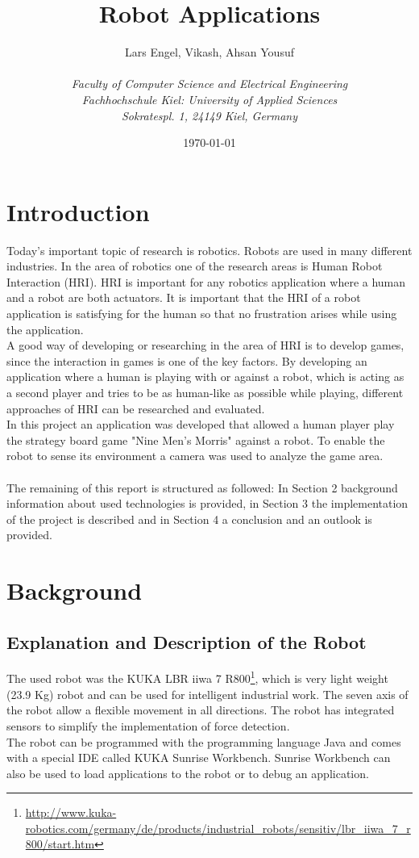 \documentclass[a4paper]{spie}  %
\title{Robot Applications}
\author{Lars Engel, Vikash, Ahsan Yousuf
\\\textit{\\Faculty of Computer Science and Electrical Engineering
\\Fachhochschule Kiel: University of Applied Sciences\\ Sokratespl. 1, 24149 Kiel, Germany}
}
\date{\today}
\begin{document}
 
  
  \begin{LARGE}
  \maketitle
  \end{LARGE}
  \vspace{60pt}
  \begin{large}
  \tableofcontents
  \newpage



\section{Introduction}
Today's important topic of research is robotics. Robots are used in many different industries. In the area of robotics one of the research areas is Human Robot Interaction (HRI). HRI is important for any robotics application where a human and a robot are both actuators. It is important that the HRI of a robot application is satisfying for the human so that no frustration arises while using the application.
\\A good way of developing or researching in the area of HRI is to develop games, since the interaction in games is one of the key factors. By developing an application where a human is playing with or against a robot, which is acting as a second player and tries to be as human-like as possible while playing, different approaches of HRI can be researched and evaluated.   
\\In this project an application was developed that allowed a human player play the strategy board game "Nine Men's Morris" against a robot. To enable the robot to sense its environment a camera was used to analyze the game area.
\paragraph{}The remaining of this report is structured as followed: In Section 2 background information about used technologies is provided, in Section 3 the implementation of the project is described and in Section 4 a conclusion and an outlook is provided.
\section{Background}
\subsection{Explanation and Description of the Robot}
The used robot was the KUKA LBR iiwa 7 R800\footnote{\url{http://www.kuka-robotics.com/germany/de/products/industrial_robots/sensitiv/lbr_iiwa_7_r800/start.htm}}, which is very light weight (23.9 Kg) robot and can be used for intelligent industrial work. The seven axis of the robot allow a flexible movement in all directions. The robot has integrated sensors to simplify the implementation of force detection.\\
The robot can be programmed with the programming language Java and comes with a special IDE called KUKA Sunrise Workbench. Sunrise Workbench can also be used to load applications to the robot or to debug an application. 

\end{large}
\end{document}
